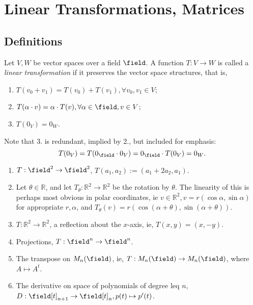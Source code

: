 \section{Linear Transformations, Matrices}
\subsection{Definitions}
\begin{definition}
    Let $V, W$ be vector spaces over a field $\field$. A function $T: V \to W$ is called a \emph{linear transformation} if it preserves the vector space structures, that is, \begin{enumerate}
        \item $T(v_0 + v_1) = T(v_0) + T(v_1), \forall v_0, v_1 \in V$;
        \item $T(\alpha \cdot v) = \alpha \cdot T(v), \forall \alpha \in \field, v \in V$;
        \item $T(0_V) = 0_W$.
    \end{enumerate}
\end{definition}

\begin{remark}
    Note that 3. is redundant, implied by 2., but included for emphasis:
    \[
    T(0_V) = T(0_\field \cdot 0_V) = 0_\field \cdot T(0_V) = 0_W.    
    \]
\end{remark}

\begin{example}
    \begin{enumerate}
        \item $T: \field^2 \to \field^2$, $T(a_1, a_2) := (a_1 + 2 a_2, a_1)$.
        \item Let $\theta \in \mathbb{R}$, and let $T_\theta : \mathbb{R}^2 \to \mathbb{R}^2$ be the rotation by $\theta$. The linearity of this is perhaps most obvious in polar coordinates, ie $v \in \mathbb{R}^2, v = r (\cos \alpha, \sin \alpha)$ for appropriate $r, \alpha$, and $T_\theta(v) = r (\cos (\alpha + \theta), \sin (\alpha + \theta))$.
        \item $T: \mathbb{R}^2 \to \mathbb{R}^2$, a reflection about the $x$-axis, ie, $T(x, y) = (x, -y)$.
        \item Projections, $T : \field^n \to \field^n$.
        \item The transpose on $M_n(\field)$, ie, $T: M_n(\field) \to M_n (\field)$, where $A \mapsto A^t$.
        \item The derivative on space of polynomials of degree leq $n$, $D : \field[t]_{n+1} \to \field[t]_{n}, p(t) \mapsto p'(t)$.
    \end{enumerate}
\end{example}

